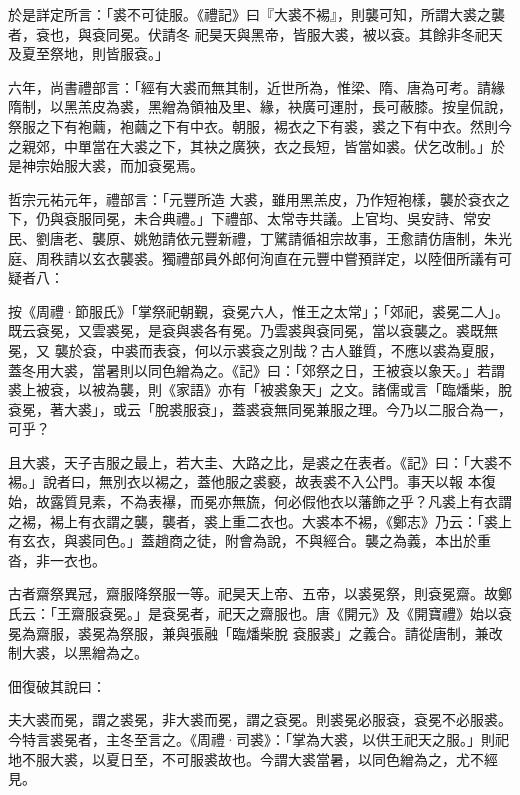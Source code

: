 \begin{pinyinscope}
 於是詳定所言：「裘不可徒服。《禮記》曰『大裘不裼』，則襲可知，所謂大裘之襲者，袞也，與袞同冕。伏請冬
 祀昊天與黑帝，皆服大裘，被以袞。其餘非冬祀天及夏至祭地，則皆服袞。」



 六年，尚書禮部言：「經有大裘而無其制，近世所為，惟梁、隋、唐為可考。請緣隋制，以黑羔皮為裘，黑繒為領袖及里、緣，袂廣可運肘，長可蔽膝。按皇侃說，祭服之下有袍繭，袍繭之下有中衣。朝服，裼衣之下有裘，裘之下有中衣。然則今之親郊，中單當在大裘之下，其袂之廣狹，衣之長短，皆當如裘。伏乞改制。」於是神宗始服大裘，而加袞冕焉。



 哲宗元祐元年，禮部言：「元豐所造
 大裘，雖用黑羔皮，乃作短袍樣，襲於袞衣之下，仍與袞服同冕，未合典禮。」下禮部、太常寺共議。上官均、吳安詩、常安民、劉唐老、襲原、姚勉請依元豐新禮，丁騭請循祖宗故事，王愈請仿唐制，朱光庭、周秩請以玄衣襲裘。獨禮部員外郎何洵直在元豐中嘗預詳定，以陸佃所議有可疑者八：



 按《周禮·節服氏》「掌祭祀朝覲，袞冕六人，惟王之太常」；「郊祀，裘冕二人」。既云袞冕，又雲裘冕，是袞與裘各有冕。乃雲裘與袞同冕，當以袞襲之。裘既無冕，又
 襲於袞，中裘而表袞，何以示裘袞之別哉？古人雖質，不應以裘為夏服，蓋冬用大裘，當暑則以同色繒為之。《記》曰：「郊祭之日，王被袞以象天。」若謂裘上被袞，以被為襲，則《家語》亦有「被裘象天」之文。諸儒或言「臨燔柴，脫袞冕，著大裘」，或云「脫裘服袞」，蓋裘袞無同冕兼服之理。今乃以二服合為一，可乎？



 且大裘，天子吉服之最上，若大圭、大路之比，是裘之在表者。《記》曰：「大裘不裼。」說者曰，無別衣以裼之，蓋他服之裘褻，故表裘不入公門。事天以報
 本復始，故露質見素，不為表襮，而冕亦無旒，何必假他衣以藩飾之乎？凡裘上有衣謂之裼，裼上有衣謂之襲，襲者，裘上重二衣也。大裘本不裼，《鄭志》乃云：「裘上有玄衣，與裘同色。」蓋趙商之徒，附會為說，不與經合。襲之為義，本出於重沓，非一衣也。



 古者齋祭異冠，齋服降祭服一等。祀昊天上帝、五帝，以裘冕祭，則袞冕齋。故鄭氏云：「王齋服袞冕。」是袞冕者，祀天之齋服也。唐《開元》及《開寶禮》始以袞冕為齋服，裘冕為祭服，兼與張融「臨燔柴脫
 袞服裘」之義合。請從唐制，兼改制大裘，以黑繒為之。



 佃復破其說曰：



 夫大裘而冕，謂之裘冕，非大裘而冕，謂之袞冕。則裘冕必服袞，袞冕不必服裘。今特言裘冕者，主冬至言之。《周禮·司裘》：「掌為大裘，以供王祀天之服。」則祀地不服大裘，以夏日至，不可服裘故也。今謂大裘當暑，以同色繒為之，尤不經見。




\end{pinyinscope}

